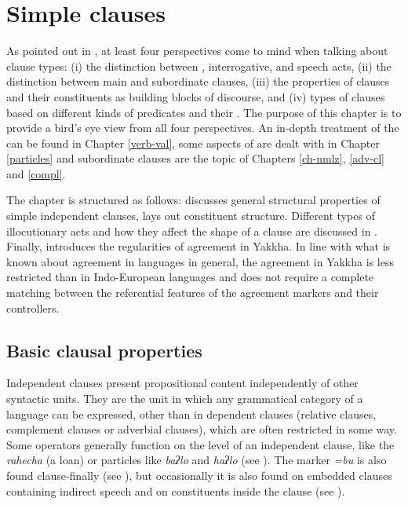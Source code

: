 ﻿\chapter{Simple clauses}\label{simp-cl}

As pointed out in \citet[224]{Dryer2007Clause}, at least four perspectives come to mind when talking about clause types: (i) the  distinction between , interrogative, and  speech acts, (ii) the distinction between main and subordinate clauses, (iii) the properties of clauses and their constituents as building blocks of discourse, and (iv) types of clauses based on different kinds of predicates and their . The purpose of this chapter is to provide a bird's eye view from all four perspectives. An in-depth treatment of the  can be found in Chapter \ref{verb-val}, some aspects of  are dealt with in Chapter \ref{particles} and subordinate clauses are the topic of  Chapters \ref{ch-nmlz},  \ref{adv-cl} and  \ref{compl}.  

The chapter is structured as follows:  discusses general structural properties of simple independent clauses,  lays out constituent structure. Different types of illocutionary acts and how they affect the shape of a clause are discussed in . Finally,  introduces the regularities of agreement in Yakkha. In line with what is known about agreement in  languages in general, the agreement in Yakkha is less restricted than in Indo-European languages and does not require a complete matching between the referential features of the agreement markers and their controllers.

\section{Basic clausal properties}\label{simp-cl1}

Independent clauses present propositional content independently of other syntactic units. They are the unit in which any grammatical category of a language can be expressed, other than in dependent clauses (relative clauses, complement clauses or adverbial clauses), which are often restricted in some way. Some operators generally function on the level of an independent clause, like the  \emph{rahecha} (a  loan) or   particles like  \emph{baʔlo} and \emph{haʔlo} (see \Next[a]). The  marker \emph{=bu} is also found clause-finally (see \Next[b]), but occasionally it is also found   on embedded clauses containing indirect speech and on constituents inside the clause (see ). 
 
